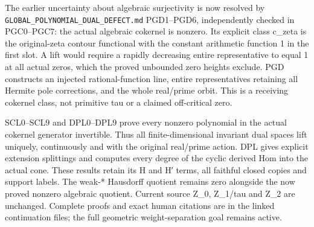 The earlier uncertainty about algebraic surjectivity is now resolved by
\nolinkurl{GLOBAL_POLYNOMIAL_DUAL_DEFECT.md} PGD1--PGD6, independently checked in
PGC0--PGC7: the actual algebraic cokernel is nonzero. Its explicit class
c\_zeta is the original-zeta contour functional with the constant
arithmetic function 1 in the first slot. A lift would require a rapidly
decreasing entire representative to equal 1 at all actual zeros, which
the proved unbounded zero heights exclude. PGD constructs an injected
rational-function line, entire representatives retaining all Hermite
pole corrections, and the whole real/prime orbit. This is a receiving
cokernel class, not primitive tau or a claimed off-critical zero.

SCL0--SCL9 and DPL0--DPL9 prove every nonzero polynomial in the actual
cokernel generator invertible. Thus all finite-dimensional invariant
dual spaces lift uniquely, continuously and with the original real/prime
action. DPL gives explicit extension splittings and computes every
degree of the cyclic derived Hom into the actual cone. These results
retain its H and H′ terms, all faithful closed copies and support
labels. The weak-* Hausdorff quotient remains zero alongside the now
proved nonzero algebraic quotient. Current source Z\_0, Z\_1/tau and
Z\_2 are unchanged. Complete proofs and exact human citations are in the
linked continuation files; the full geometric weight-separation goal
remains active.
